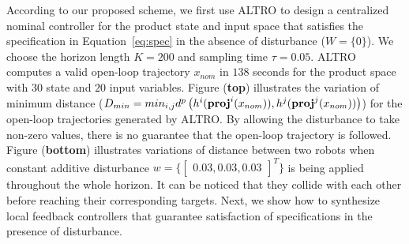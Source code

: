 According to our proposed scheme, we first use ALTRO to design a centralized nominal controller for the product state and input space that satisfies the specification in Equation~\eqref{eq:spec} in the absence of disturbance ($W=\{0\}$). We choose the horizon length $K=200$ and sampling time $\tau=0.05$. ALTRO computes a valid open-loop trajectory $x_{nom}$ in $138$ seconds for the product space with $30$ state and $20$ input variables. Figure  (\textbf{top}) illustrates the variation of minimum distance ($D_{min}=min_{i,j}d^{p}\left(h^i(\mathbf{proj}^i(x_{nom})),h^j(\mathbf{proj}^j(x_{nom}))\right)$) for the open-loop trajectories generated by ALTRO. By allowing the disturbance to take non-zero values, there is no guarantee that the open-loop trajectory is followed. Figure  (\textbf{bottom}) illustrates variations of distance between two robots when constant additive disturbance $w=\{\begin{bmatrix}0.03,0.03,0.03\end{bmatrix}^T\}$ is being applied throughout the whole horizon. It can be noticed that they collide with each other before reaching their corresponding targets. Next, we show how to synthesize local feedback controllers that guarantee satisfaction of specifications in the presence of disturbance. %

